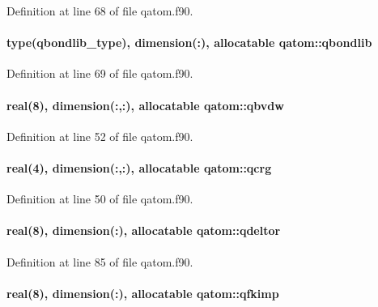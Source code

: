 Definition at line 68 of file qatom.\-f90.

\hypertarget{classqatom_a196079879269f180af8f7182248bbeaa}{
\paragraph[{qbondlib}]{\setlength{\rightskip}{0pt plus 5cm}type({\bf qbondlib\-\_\-type}), dimension(\-:), allocatable qatom\-::qbondlib}}\label{classqatom_a196079879269f180af8f7182248bbeaa}


Definition at line 69 of file qatom.\-f90.

\hypertarget{classqatom_a2a1d93acc56540aa6051e266e8cacacd}{
\paragraph[{qbvdw}]{\setlength{\rightskip}{0pt plus 5cm}real(8), dimension(\-:,\-:), allocatable qatom\-::qbvdw}}\label{classqatom_a2a1d93acc56540aa6051e266e8cacacd}


Definition at line 52 of file qatom.\-f90.

\hypertarget{classqatom_a64f11bcf0290f6852b578ee62ace7a5e}{
\paragraph[{qcrg}]{\setlength{\rightskip}{0pt plus 5cm}real(4), dimension(\-:,\-:), allocatable qatom\-::qcrg}}\label{classqatom_a64f11bcf0290f6852b578ee62ace7a5e}


Definition at line 50 of file qatom.\-f90.

\hypertarget{classqatom_a6cb08436e73ba064c40610f3c1692a9e}{
\paragraph[{qdeltor}]{\setlength{\rightskip}{0pt plus 5cm}real(8), dimension(\-:), allocatable qatom\-::qdeltor}}\label{classqatom_a6cb08436e73ba064c40610f3c1692a9e}


Definition at line 85 of file qatom.\-f90.

\hypertarget{classqatom_a365c7af276378468e52670e7da26e41a}{
\paragraph[{qfkimp}]{\setlength{\rightskip}{0pt plus 5cm}real(8), dimension(\-:), allocatable qatom\-::qfkimp}}\label{classqatom_a365c7af276378468e52670e7da26e41a}


